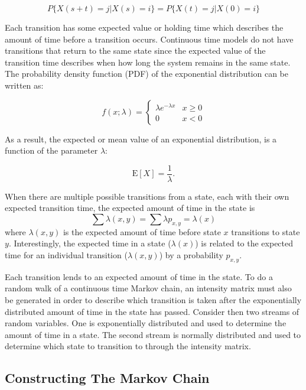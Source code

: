 \begin{equation}
P\{ X(s+t)=j | X(s) = i \} = P\{ X(t)=j | X(0) = i \}
\end{equation}

Each transition has some expected value or holding time which describes the amount of time before a transition occurs.
Continuous time models do not have transitions that return to the same state since the expected value of the transition time describes when how long the system  remains in the same state.
The probability density function (PDF) of the exponential distribution can be written as: \cite{MARKOV1}

\begin{equation}
f(x;\lambda) = \begin{cases}
\lambda e^{-\lambda x} & x \ge 0 \\
0 & x < 0
\end{cases}
\end{equation}

As a result, the expected or mean value of an exponential distribution, is a function of
the parameter $\lambda$: \cite{MARKOV1}

\begin{equation}
\mathrm{E}[X] = \frac{1}{\lambda}. \!
\end{equation}

When there are multiple possible transitions from a state, each with their own expected transition time, the expected amount of time in the state is \cite{MARKOV2}
\begin{equation}
\sum \lambda(x,y) = \sum \lambda p_{x,y} = \lambda(x)
\end{equation}
where $\lambda(x,y)$ is the expected amount of time before state $x$ transitions to state $y$.
Interestingly, the expected time in a state ($\lambda(x)$) is related to the expected time for an individual transition ($\lambda(x,y)$) by a probability $p_{x,y}$.

Each transition lends to an expected amount of time in the state.
To do a random walk of a continuous time Markov chain, an intensity matrix must also be generated in order to describe which transition is taken after the exponentially distributed amount of time in the state has passed.
Consider then two streams of random variables.
One is exponentially distributed and used to determine the amount of time in a state.
The second stream is normally distributed and used to determine which state to transition to through the intensity matrix.

\subsection{Constructing The Markov Chain}

